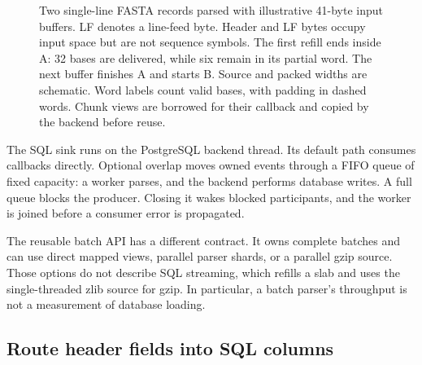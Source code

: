 \begin{figure}[htbp]
\caption{Two single-line FASTA records parsed with illustrative 41-byte input
buffers. LF denotes a line-feed byte. Header and LF bytes occupy input space
but are not sequence symbols.
The first refill ends inside A: 32 bases are delivered, while six remain in
its partial word. The next buffer finishes A and starts B. Source and packed
widths are schematic. Word labels count valid bases, with padding in dashed
words. Chunk views
are borrowed for their callback and copied by the backend before reuse.}
\label{fig:arch-io-state}
\label{fig:io-load-pipeline}
\end{figure}

The SQL sink runs on the PostgreSQL backend thread. Its default path consumes
callbacks directly. Optional overlap moves owned events through a FIFO queue
of fixed capacity: a worker parses, and the backend performs database writes.
A full queue blocks the producer. Closing it wakes blocked participants, and
the worker is joined before a consumer error is propagated.

The reusable batch API has a different contract. It owns complete batches and
can use direct mapped views, parallel parser shards, or a parallel gzip
source. Those options do not describe SQL streaming, which refills a slab and
uses the single-threaded zlib source for gzip. In particular, a batch parser's
throughput is not a measurement of database loading.

\subsection{Route header fields into SQL columns}
\label{sec:arch-io-headers}
\label{sec:io-header-mapping}
\label{sec:io-sql}

